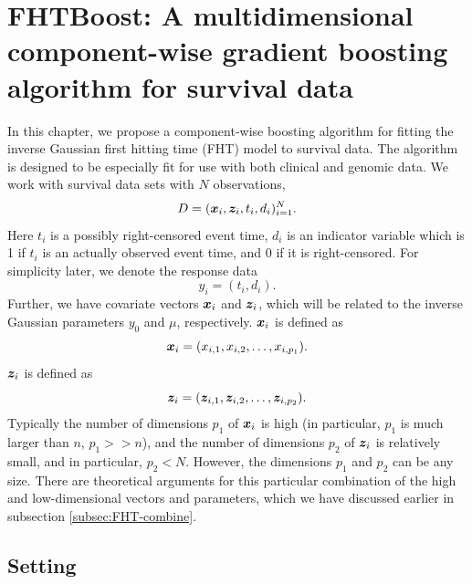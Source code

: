 \chapter{FHTBoost: A multidimensional component-wise gradient boosting algorithm for survival data}
\label{ch:FHTboost}
In this chapter, we propose a component-wise boosting algorithm for fitting the inverse Gaussian first hitting time (FHT) model to survival data.
The algorithm is designed to be especially fit for use with both clinical and genomic data.
We work with survival data sets with $N$ observations,
\begin{equation*}
    D=(\bm{x}_i,\bm{z}_i,t_i,d_i)_{i=1}^N.
\end{equation*}
Here $t_i$ is a possibly right-censored event time, $d_i$ is an indicator variable which is 1 if $t_i$ is an actually observed event time, and 0 if it is right-censored.
For simplicity later, we denote the response data
\begin{equation*}
    y_i=(t_i,d_i).
\end{equation*}
Further, we have covariate vectors $\bm{x}_i$ and $\bm{z}_i$, which will be related to the inverse Gaussian parameters $y_0$ and $\mu$, respectively.
$\bm{x}_i$ is defined as
\begin{equation}
    \bm{x}_i=(x_{i,1},x_{i,2},\ldots,x_{i,p_1}).
\end{equation}
$\bm{z}_i$ is defined as
\begin{equation}
    \bm{z}_i=(\bm{z}_{i,1},\bm{z}_{i,2},\ldots,\bm{z}_{i,p_2}).
\end{equation}
Typically the number of dimensions $p_1$ of $\bm{x}_i$ is high (in particular, $p_1$ is much larger than $n$, $p_1 >> n$), and the number of dimensions $p_2$ of $\bm{z}_i$ is relatively small, and in particular, $p_2 < N$.
However, the dimensions $p_1$ and $p_2$ can be any size.
There are theoretical arguments for this particular combination of the high and low-dimensional vectors and parameters, which we have discussed earlier in subsection \ref{subsec:FHT-combine}.

\section{Setting}
